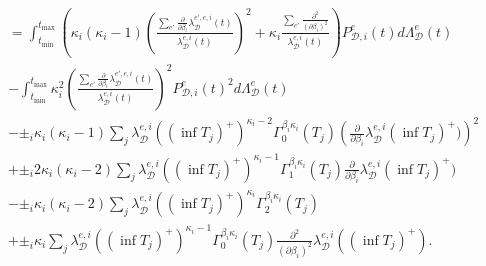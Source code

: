\documentclass[honours,12pt]{unswthesis}
\numberwithin{equation}{section}
\begin{document}
\begin{equation*}
\begin{align}
		&= \int_{t_\mathrm{min}}^{t_\mathrm{max}} \left( \kappa_i(\kappa_i-1)\left(\frac{\sum_{e'}\frac{\partial}{\partial\beta_i}\lambda_\mathcal{D}^{e',e,i}(t)}{\lambda_\mathcal{D}^{e,i}(t)}\right)^2 + \kappa_i \frac{\sum_{e'}\frac{\partial^2}{(\partial\beta_i)^2}}{\lambda_\mathcal{D}^{e,i}(t)} \right) P_{\mathcal{D},i}^e(t) d\Lambda_\mathcal{D}^e(t) \\
		&- \int_{t_\mathrm{min}}^{t_\mathrm{max}} \kappa_i^2\left(\frac{\sum_{e'}\frac{\partial}{\partial\beta_i}\lambda_\mathcal{D}^{e',e,i}(t)}{\lambda_\mathcal{D}^{e,i}(t)}\right)^2 P_{\mathcal{D},i}^e(t)^2 d\Lambda_\mathcal{D}^e(t) \\
		&- \pm_i\kappa_i(\kappa_i-1) \sum_j \lambda_\mathcal{D}^{e,i}((\inf T_j)^+)^{\kappa_i-2} \Gamma_0^{\beta_i\kappa_i}(T_j) \left(\frac{\partial}{\partial\beta_i}\lambda_\mathcal{D}^{e,i}(\inf T_j)^+)\right)^2 \\
		&+ \pm_i2\kappa_i(\kappa_i-2) \sum_j \lambda_\mathcal{D}^{e,i}((\inf T_j)^+)^{\kappa_i-1} \Gamma_1^{\beta_i\kappa_i}(T_j) \frac{\partial}{\partial\beta_i}\lambda_\mathcal{D}^{e,i}(\inf T_j)^+) \\
		&- \pm_i\kappa_i(\kappa_i-2) \sum_j \lambda_\mathcal{D}^{e,i}((\inf T_j)^+)^{\kappa_i} \Gamma_2^{\beta_i\kappa_i}(T_j) \\
		&+ \pm_i\kappa_i \sum_j \lambda_\mathcal{D}^{e,i}((\inf T_j)^+)^{\kappa_i-1} \Gamma_0^{\beta_i\kappa_i}(T_j) \frac{\partial^2}{(\partial\beta_i)^2}\lambda_\mathcal{D}^{e,i}((\inf T_j)^+). \\
	\end{align}
\end{equation*}
\end{document}
